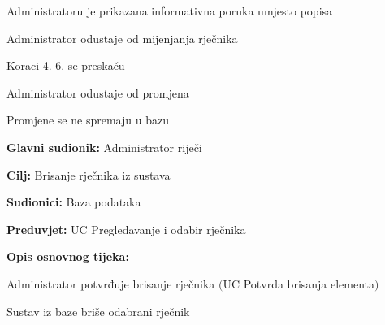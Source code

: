 \begin{packed_item}
\begin{packed_item}
\begin{packed_enum}
			\item Administratoru je prikazana informativna poruka umjesto popisa
			\item Administrator odustaje od mijenjanja rječnika
			\item Koraci 4.-6. se preskaču
			
		\end{packed_enum}

		\item[5.a] Administrator odustaje od promjena
		\item[] \begin{packed_enum}
			
			\item Promjene se ne spremaju u bazu
			
		\end{packed_enum}
		
	\end{packed_item}

\end{packed_item}
					

					\noindent {}
					\begin{packed_item}
	
						\item \textbf{Glavni sudionik:} Administrator riječi
						\item  \textbf{Cilj:} Brisanje rječnika iz sustava
						\item  \textbf{Sudionici:} Baza podataka
						\item  \textbf{Preduvjet:} UC Pregledavanje i odabir rječnika
						\item  \textbf{Opis osnovnog tijeka:}
						
						\item[] \begin{packed_enum}
	
							\item Administrator potvrđuje brisanje rječnika $($UC Potvrda brisanja elementa$)$
							\item Sustav iz baze briše odabrani rječnik
						\end{packed_enum}
					
					\end{packed_item}

